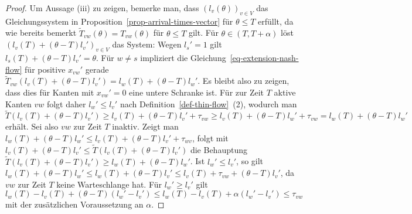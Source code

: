 \begin{proof}
	Um Aussage (iii) zu zeigen, bemerke man, dass $(l_v(\theta))_{v\in V}$ das Gleichungssystem in Proposition~\ref{prop-arrival-times-vector} für $\theta \leq T$ erfüllt, da wie bereits bemerkt $\tilde{T}_{vw}(\theta) = T_{vw}(\theta)$ für $\theta\leq T$ gilt.
	Für $\theta \in (T, T+\alpha)$ löst $(l_v(T) + (\theta - T)l_v')_{v\in V}$  das System:
	Wegen $l_s' = 1$ gilt $l_s(T) + (\theta - T)l_v' = \theta$.
	Für $w\neq s$ impliziert die Gleichung~\ref{eq-extension-nash-flow} für positive $x_{vw}'$ gerade $\tilde{T}_{vw}(l_v(T) + (\theta-T)l_v') = l_w(T) + (\theta - T) l_w'$.
	Es bleibt also zu zeigen, dass dies für Kanten mit $x_{vw}' = 0$ eine untere Schranke ist.
	Für zur Zeit $T$ aktive Kanten $vw$ folgt daher $l_w'\leq l_v'$ nach Definition~\ref{def-thin-flow}~(2), wodurch man $\tilde{T}(l_v(T) + (\theta - T)l_v')\geq l_v(T) + (\theta - T)l_v' + \tau_{vw}\geq l_v(T) + (\theta - T)l_w' + \tau_{vw} = l_w(T) + (\theta-T)l_w'$ erhält.
	Sei also $vw$ zur Zeit $T$ inaktiv.
	Zeigt man $l_w(T) + (\theta - T)l_w' \leq l_v(T) + (\theta - T)l_v' + \tau_{wv}$, folgt mit $l_v(T) + (\theta - T)l_v' \leq \tilde{T}(l_v(T) + (\theta - T)l_v')$ die Behauptung
	$\tilde{T}(l_v(T) + (\theta - T) l_v') \geq l_w(T) + (\theta - T)l_w'$.
	Ist $l_w' \leq l_v'$, so gilt $l_w(T) +(\theta - T)l_w' \leq l_w(T) + (\theta - T)l_v' \leq l_v(T) + \tau_{vw} + (\theta - T)l_v'$, da $vw$ zur Zeit $T$ keine Warteschlange hat.
	Für $l_w' \geq l_v'$ gilt $l_w(T) - l_v(T) + (\theta - T) (l_w' - l_v') \leq l_w(T) - l_v(T) + \alpha (l_w' - l_v') \leq \tau_{vw}$ mit der zusätzlichen Voraussetzung an $\alpha$.
\end{proof}